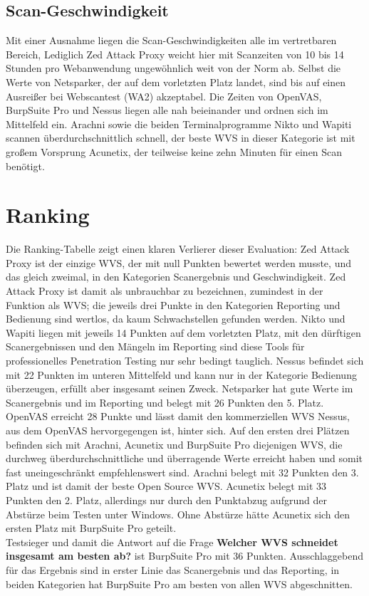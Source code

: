 \documentclass[12pt,oneside,a4paper,parskip,pointlessnumbers]{scrbook}
\begin{document}
  \subsection{Scan-Geschwindigkeit}
  Mit einer Ausnahme liegen die Scan-Geschwindigkeiten alle im vertretbaren Bereich, Lediglich Zed Attack Proxy weicht hier mit Scanzeiten von 10 bis 14 Stunden pro Webanwendung ungewöhnlich weit von der Norm ab. Selbst die Werte von Netsparker, der auf dem vorletzten Platz landet, sind bis auf einen Ausreißer bei Webscantest (WA2) akzeptabel. Die Zeiten von OpenVAS, BurpSuite Pro und Nessus liegen alle nah beieinander und ordnen sich im Mittelfeld ein. Arachni sowie die beiden Terminalprogramme Nikto und Wapiti scannen überdurchschnittlich schnell, der beste WVS in dieser Kategorie ist mit großem Vorsprung Acunetix, der teilweise keine zehn Minuten für einen Scan benötigt.
  \section{Ranking}
  Die Ranking-Tabelle zeigt einen klaren Verlierer dieser Evaluation: Zed Attack Proxy ist der einzige WVS, der mit null Punkten bewertet werden musste, und das gleich zweimal, in den Kategorien Scanergebnis und Geschwindigkeit. Zed Attack Proxy ist damit als unbrauchbar zu bezeichnen, zumindest in der Funktion als WVS; die jeweils drei Punkte in den Kategorien Reporting und Bedienung sind wertlos, da kaum Schwachstellen gefunden werden. Nikto und Wapiti liegen mit jeweils 14 Punkten auf dem vorletzten Platz, mit den dürftigen Scanergebnissen und den Mängeln im Reporting sind diese Tools für professionelles Penetration Testing nur sehr bedingt tauglich. Nessus befindet sich mit 22 Punkten im unteren Mittelfeld und kann nur in der Kategorie Bedienung überzeugen, erfüllt aber insgesamt seinen Zweck. Netsparker hat gute Werte im Scanergebnis und im Reporting und belegt mit 26 Punkten den 5. Platz. OpenVAS erreicht 28 Punkte und lässt damit den kommerziellen WVS Nessus, aus dem OpenVAS hervorgegengen ist, hinter sich.
  Auf den ersten drei Plätzen befinden sich mit Arachni, Acunetix und BurpSuite Pro diejenigen WVS, die durchweg überdurchschnittliche und überragende Werte erreicht haben und somit fast uneingeschränkt empfehlenswert sind. Arachni belegt mit 32 Punkten den 3. Platz und ist damit der beste Open Source WVS.
  Acunetix belegt mit 33 Punkten den 2. Platz, allerdings nur durch den Punktabzug aufgrund der Abstürze beim Testen unter Windows. Ohne Abstürze hätte Acunetix sich den ersten Platz mit BurpSuite Pro geteilt.\\
  Testsieger und damit die Antwort auf die Frage \textbf{Welcher WVS schneidet insgesamt am besten ab?} ist BurpSuite Pro mit 36 Punkten. Ausschlaggebend für das Ergebnis sind in erster Linie das Scanergebnis und das Reporting, in beiden Kategorien hat BurpSuite Pro am besten von allen WVS abgeschnitten.
\end{document}

